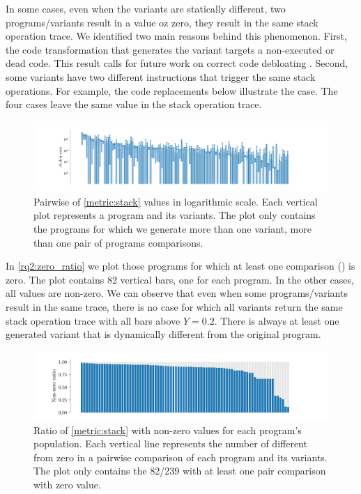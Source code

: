 In some cases, even when the variants are statically different, two programs/variants result in a \DTW value oz zero, \ie they result in the same stack operation trace. We identified two main reasons behind this phenomenon. First, the code transformation that generates the variant targets a non-executed or dead code. This result calls for future work on correct code debloating \citationneeded. Second, some variants have two different instructions that trigger the same stack operations. For example, the code replacements below illustrate the case. The four cases leave the same value in the stack operation trace.




\begin{figure}[h]
    \centering
    \hspace*{-0.1\linewidth}\includegraphics[width=1.2\linewidth]{plots/dtw_distrib.pdf}
    \caption{Pairwise of \autoref{metric:stack} values in logarithmic scale. Each vertical plot represents a program and its variants. The plot only contains the programs for which we generate more than one variant, \ie more than one pair of programs comparisons. }
    \label{rq2:dtw_distrib}
\end{figure}

In \autoref{rq2:zero_ratio} we plot those programs for which at least one comparison (\DTW) is zero. The plot contains 82 vertical bars, one for each program. In the other cases, all \DTW values are non-zero. We can observe that even when some programs/variants result in the same trace, there is no case for which all variants return the same stack operation trace with all bars above $Y=0.2$. There is always at least one generated variant that is dynamically different from the original program. 

\newcommand{\zerocountprogs}{82\xspace}

\begin{figure}[h]
    \centering
    \hspace*{-0.1\linewidth}\includegraphics[width=1.2\linewidth]{plots/non_zero_ratio.pdf}
    \caption{ Ratio of \autoref{metric:stack} with non-zero values for each program's population. Each vertical line represents the number of \DTW different from zero in a pairwise comparison of each program and its variants. The plot only contains the \zerocountprogs/239  with at least one pair comparison with zero value.}
    \label{rq2:zero_ratio}
\end{figure}

